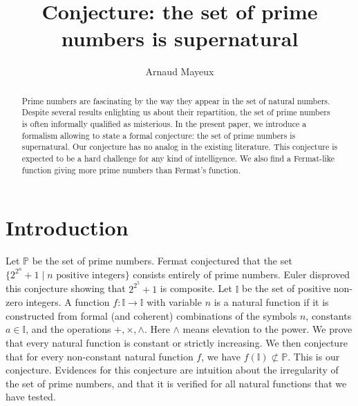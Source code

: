 \documentclass{alggeom}
\title[Conjecture about prime numbers]{Conjecture: the set of prime numbers is supernatural}
\newcommand{\I}{\mathbb{I}}
\newcommand{\pp}{\mathbb{P}}
\begin{document}
\author{Arnaud Mayeux}
\address{Einstein Institute of Mathematics,
The Hebrew University of Jerusalem,
 Jerusalem, 9190401, Israel}



\begin{abstract}
 Prime numbers are fascinating by the way they appear in the set of natural numbers. Despite several results enlighting us about their repartition, the set of prime numbers is often informally qualified as misterious. In the present paper, we introduce a formalism allowing to state a formal conjecture: the set of prime numbers is supernatural. Our conjecture has no analog in the existing literature. This conjecture is expected to be a hard challenge for any kind of intelligence. We also find a Fermat-like function giving more prime numbers than Fermat's function.  
\end{abstract}


\maketitle





\tableofcontents




\section*{Introduction}
 \begin{sloppypar}
Let $\pp$ be the set of prime numbers.
Fermat  \cite{fermat} conjectured that the set  $\{ 2^{2^n}+1 \mid n \text{ positive integers} \} $ consists entirely of prime numbers. Euler \cite{euler1, euler2} disproved this conjecture showing that $2^{2^5}+1$ is composite. Let $\mathbb{I}$ be the set of positive non-zero integers. A function $f : \I \to \I $ with variable $n$ is a natural function if it is constructed from formal (and coherent) combinations of the symbols $n$, constants $ a \in \I$, and the operations $+ , \times , \wedge$. Here $\wedge$ means elevation to the power. We prove that every natural function is constant or strictly increasing. We then conjecture that for every non-constant natural function $f$, we have $f (\I ) \not \subset \pp$.  This is our conjecture. Evidences for this conjecture are intuition about the irregularity of the set of prime numbers, and that it is verified for all natural functions that we have tested. \end{sloppypar}
\end{document}
